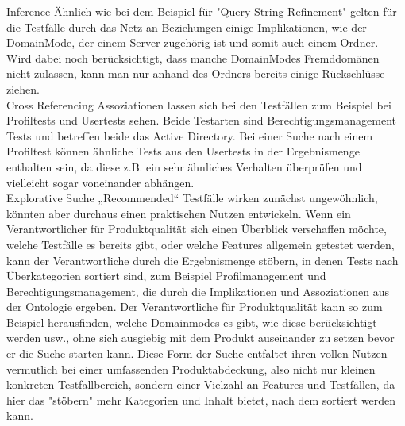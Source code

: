 Inference\newline
Ähnlich wie bei dem Beispiel für "Query String Refinement" gelten für die Testfälle durch das Netz an Beziehungen einige Implikationen, wie der DomainMode, der einem Server zugehörig ist und somit auch einem Ordner. Wird dabei noch berücksichtigt, dass manche DomainModes Fremddomänen nicht zulassen, kann man nur anhand des Ordners bereits einige Rückschlüsse ziehen.\\

Cross Referencing \newline
Assoziationen lassen sich bei den Testfällen zum Beispiel bei Profiltests und Usertests sehen. Beide Testarten sind Berechtigungsmanagement Tests und betreffen beide das Active Directory. Bei einer Suche nach einem Profiltest können ähnliche Tests aus den Usertests in der Ergebnismenge enthalten sein, da diese z.B. ein sehr ähnliches Verhalten überprüfen und vielleicht sogar voneinander abhängen.\\

Explorative Suche\newline
„Recommended“ Testfälle wirken zunächst ungewöhnlich, könnten aber durchaus einen praktischen Nutzen entwickeln. Wenn ein Verantwortlicher für Produktqualität sich einen Überblick verschaffen möchte, welche Testfälle es bereits gibt, oder welche Features allgemein getestet werden, kann der Verantwortliche durch die Ergebnismenge stöbern, in denen Tests nach Überkategorien sortiert sind, zum Beispiel Profilmanagement und Berechtigungsmanagement, die durch die Implikationen und Assoziationen aus der Ontologie ergeben. Der Verantwortliche für Produktqualität kann so zum Beispiel herausfinden, welche Domainmodes es gibt, wie diese berücksichtigt werden usw., ohne sich ausgiebig mit dem Produkt auseinander zu setzen bevor er die Suche starten kann. Diese Form der Suche entfaltet ihren vollen Nutzen vermutlich bei einer umfassenden Produktabdeckung, also nicht nur kleinen konkreten Testfallbereich, sondern einer Vielzahl an Features und Testfällen, da hier das "stöbern" mehr Kategorien und Inhalt bietet, nach dem sortiert werden kann.

